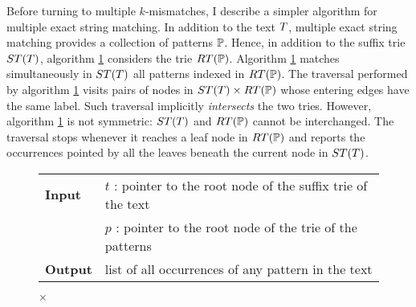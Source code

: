 Before turning to multiple $k$-mismatches, I describe a simpler algorithm for multiple exact string matching.
In addition to the text $T$, multiple exact string matching provides a collection of patterns $\mathbb{P}$.
Hence, in addition to the suffix trie $ST(T)$, algorithm \ref{alg:st-exact-multi} considers the trie $RT(\mathbb{P})$.
Algorithm \ref{alg:st-exact-multi} matches simultaneously in $ST(T)$ all patterns indexed in $RT(\mathbb{P})$.
The traversal performed by algorithm \ref{alg:st-exact-multi} visits pairs of nodes in $ST(T) \times RT(\mathbb{P})$ whose entering edges have the same label.
Such traversal implicitly \emph{intersects} the two tries.
However, algorithm \ref{alg:st-exact-multi} is not symmetric: $ST(T)$ and $RT(\mathbb{P})$ cannot be interchanged.
The traversal stops whenever it reaches a leaf node in $RT(\mathbb{P})$ and reports the occurrences pointed by all the leaves beneath the current node in $ST(T)$.

\begin{figure*}[t]
\begin{center}
\begin{minipage}[t]{.8\textwidth}
\begin{algorithm}[H]
\begin{tabular}{ll}
\textbf{Input}  & $t$ : pointer to the root node of the suffix trie of the text\\
 			    & $p$ : pointer to the root node of the trie of the patterns\\
\textbf{Output} & list of all occurrences of any pattern in the text\\
\end{tabular}
\begin{algorithmic}[1]
	\State \Report {} $\times$ 
\Else
	\State {}
	\Repeat
			\State {}
			\State {}
		\EndIf
\EndIf
\end{algorithmic}
\label{alg:st-exact-multi}
\end{algorithm}
\end{minipage}
\end{center}
\end{figure*}

